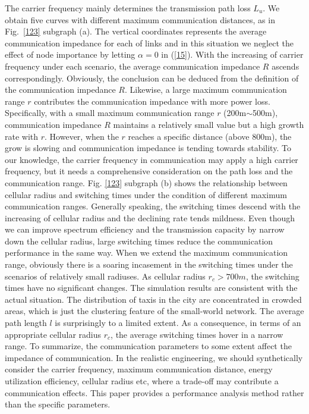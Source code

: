 \documentclass[journal,12pt,draftclsnofoot,onecolumn]{IEEEtran}
\begin{document}
The carrier frequency mainly determines the transmission path loss $L_{u}$. We obtain five curves with different maximum communication distances, as in Fig.~\ref{123} subgraph (a). The vertical coordinates represents the average communication impedance for each of links and in this situation we neglect the effect of node importance by letting $\alpha=0$ in (\ref{15}). With the increasing of carrier frequency under each scenario, the average communication impedance $R$ ascends correspondingly. Obviously, the conclusion can be deduced from the definition of the communication impedance $R$. Likewise, a large maximum communication range $r$ contributes the communication impedance with more power loss. Specifically, with a small maximum communication range $r$ (200m$\sim$500m), communication impedance $R$ maintains a relatively small value but a high growth rate with $r$. However, when the $r$ reaches a specific distance (above 800m), the grow is slowing and communication impedance is tending towards stability. To our knowledge, the carrier frequency in communication may apply a high carrier frequency, but it needs a comprehensive consideration on the path loss and the communication range.
Fig. \ref{123} subgraph (b) shows the relationship between cellular radius and switching times under the condition of different maximum communication ranges. Generally speaking, the switching times descend with the increasing of cellular radius and the declining rate tends mildness. Even though we can improve spectrum efficiency and the transmission capacity by narrow down the cellular radius, large switching times reduce the communication performance in the same way. When we extend the maximum communication range, obviously there is a soaring incasement in the switching times under the scenarios of relatively small radiuses. As cellular radius $r_{c}>700m$, the switching times have no significant changes. The simulation results are consistent with the actual situation. The distribution of taxis in the city are concentrated in crowded areas, which is just the clustering feature of the small-world network. The average path length $l$ is surprisingly to a limited extent. As a consequence, in terms of an appropriate cellular radius $r_{c}$, the average switching times hover in a narrow range.
To summarize, the communication parameters to some extent affect the impedance of communication. In the realistic engineering, we should synthetically consider the carrier frequency, maximum communication distance, energy utilization efficiency, cellular radius etc, where a trade-off may contribute a communication effects. This paper provides a performance analysis method rather than the specific parameters.
\end{document}
